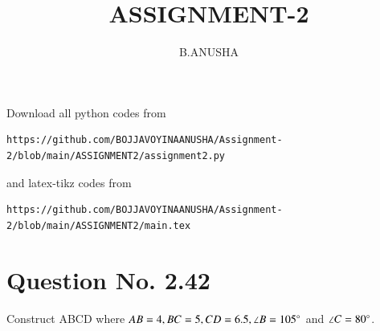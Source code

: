 \documentclass[journal,12pt,twocolumn]{IEEEtran}
\begin{document}
     \def\centbox#1{\makebox[0in]{#1}}
     \def\topbox#1{\raisebox{-\baselineskip}[0in][0in]{#1}}
     \def\midbox#1{\raisebox{-0.5\baselineskip}[0in][0in]{#1}}
\vspace{3cm}
\title{ASSIGNMENT-2}
\author{B.ANUSHA}
\maketitle
\newpage
\bigskip
\renewcommand{\thefigure}{\theenumi}
\renewcommand{\thetable}{\theenumi}
Download all python codes from 
\begin{lstlisting}
https://github.com/BOJJAVOYINAANUSHA/Assignment-2/blob/main/ASSIGNMENT2/assignment2.py
\end{lstlisting}
%
and latex-tikz codes from 
%
\begin{lstlisting}
https://github.com/BOJJAVOYINAANUSHA/Assignment-2/blob/main/ASSIGNMENT2/main.tex
\end{lstlisting}
%
\section{Question No. 2.42}
Construct ABCD where $AB = 4, BC = 5, CD = 6.5, \angle B = 105 \degree$ and $\angle C = 80 \degree$.
%
\end{document}
